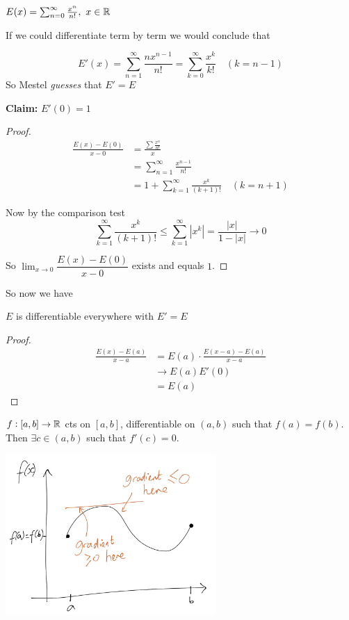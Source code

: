 \documentclass[twoside]{scrartcl}
\begin{document}
\begin{example}
$E(x) = \sum_{n=0}^\infty \frac{x^n}{n!},~x\in\mathbb{R}$	

If we could differentiate term by term we would conclude that

\[E'(x) = \sum_{n=1}^\infty \frac{nx^{n-1}}{n!} = \sum_{k=0}^\infty \frac{x^k}{k!} \quad(k=n-1)\]
So Mestel \emph{guesses} that $E' = E$

\textbf{Claim:} $E'(0) = 1$
\begin{proof}
\[\begin{aligned}\frac{E(x) -E(0)}{x-0} &= \frac{\sum \frac{x^n}{n!}}{x}\\
&= \sum_{n=1}^\infty \frac{x^{n-1}}{n!}\\
&= 1 + \sum_{k=1}^\infty \frac{x^k}{(k+1)!} \quad(k = n+1)
\end{aligned}
\]

Now by the comparison test \[\sum_{k=1}^\infty \frac{x^k}{(k+1)!} \leq \sum_{k=1}^\infty |x^k| = \dfrac{|x|}{1-|x|} \to 0\]

So $\lim_{x\to 0} \dfrac{E(x) - E(0)}{x-0}$ exists and equals $1$. 
\end{proof}

So now we have
\begin{proposition}
$E$ is differentiable everywhere with $E' = E$	
\end{proposition}
\begin{proof}

\[\begin{aligned}
\frac{E(x) - E(a)}{x-a} &= E(a)\cdot \frac{E(x-a)-E(a)}{x-a}\\
 &\to E(a)E'(0) \\
&= E(a)	
\end{aligned}
\]	
\end{proof}
\end{example}\vspace*{15pt}


\vspace*{5pt}


\begin{theorem}
	$f:[a,b] \to \mathbb{R}$ cts on $[a,b]$, differentiable on $(a,b)$ such that $f(a) = f(b)$. Then $\exists c \in (a,b)$ such that $f'(c) = 0$.
\end{theorem}



\begin{center}
\includegraphics[width = 8cm]{rolle.jpg}
\end{center}
\end{document}
